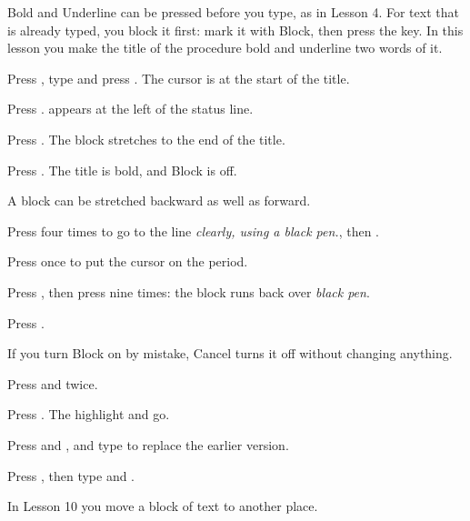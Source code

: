 Bold and Underline can be pressed before you type, as in Lesson 4.  For text
that is already typed, you block it first: mark it with Block, then press
the key.  In this lesson you make the title of the procedure bold and
underline two words of it.

\begin{WPSteps}
\item Press , type  and press
.  The cursor is at the start of the title.
\item Press .   appears at the left of the
status line.
\item Press .  The block stretches to the end of the title.
\end{WPSteps}
\begin{WPSteps}[resume]
\item Press .  The title is bold, and Block is off.
\end{WPSteps}

A block can be stretched backward as well as forward.
\begin{WPSteps}
\item Press  four times to go to the line
\textit{clearly, using a black pen.}, then .
\item Press  once to put the cursor on the period.
\item Press , then press  nine times: the
block runs back over \textit{black pen}.
\item Press .
\end{WPSteps}

If you turn Block on by mistake, Cancel turns it off without changing
anything.
\begin{WPSteps}
\item Press  and  twice.
\item Press .  The highlight and  go.
\end{WPSteps}

\begin{WPSteps}
\item Press  and , and type  to
replace the earlier version.
\item Press , then type  and .
\end{WPSteps}
\EndReplay
In Lesson 10 you move a block of text to another place.
